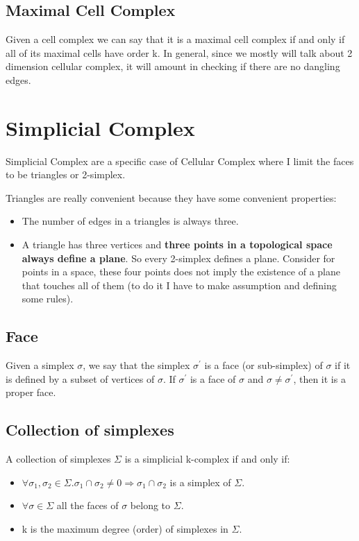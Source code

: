 \subsection{Maximal Cell Complex}
Given a cell complex we can say that it is a maximal cell complex if and only if all of its maximal cells have order k. In general, since we mostly will talk about 2 dimension cellular complex, it will amount in checking if there are no dangling edges.

\section{Simplicial Complex}
Simplicial Complex are a specific case of Cellular Complex where I limit the faces to be triangles or 2-simplex.\par
Triangles are really convenient because they have some convenient properties:

\begin{itemize}
    \item The number of edges in a triangles is always three. 
    \item A triangle has three vertices and \textbf{three points in a topological space always define a plane}. So every 2-simplex defines a plane. Consider for points in a space, these four points does not imply the existence of a plane that touches all of them (to do it I have to make assumption and defining some rules).
\end{itemize}

\subsection{Face}
Given a simplex $\sigma$, we say that the simplex $\sigma^{'}$ is a face (or sub-simplex) of $\sigma$ if it is defined by a subset of vertices of $\sigma$. If $\sigma^{'}$ is a face of $\sigma$ and $\sigma \neq \sigma^{'}$, then it is a proper face.

\subsection{Collection of simplexes}
A collection of simplexes $\Sigma$ is a simplicial k-complex if and only if:
\begin{itemize}
    \item $\forall \sigma_{1}, \sigma_{2} \in \Sigma . \sigma_{1} \cap \sigma_{2} \neq 0 \Rightarrow \sigma_{1} \cap \sigma_{2}$ is a simplex of $\Sigma$.
    \item $\forall \sigma \in \Sigma$ all the faces of $\sigma$ belong to $\Sigma$.
    \item k is the maximum degree (order) of simplexes in $\Sigma$.
\end{itemize}

